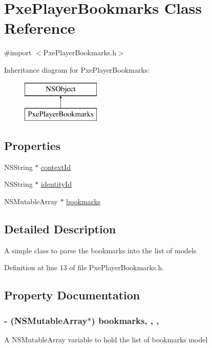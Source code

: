 \hypertarget{interface_pxe_player_bookmarks}{\section{Pxe\-Player\-Bookmarks Class Reference}
\label{interface_pxe_player_bookmarks}
}


{\ttfamily \#import $<$Pxe\-Player\-Bookmarks.\-h$>$}

Inheritance diagram for Pxe\-Player\-Bookmarks\-:\begin{figure}[H]
\begin{center}
\leavevmode
\includegraphics[height=2.000000cm]{interface_pxe_player_bookmarks}
\end{center}
\end{figure}
\subsection*{Properties}
\begin{DoxyCompactItemize}
\item 
N\-S\-String $\ast$ \hyperlink{interface_pxe_player_bookmarks_a7cae98aa1c704bcf06ebeb3849b58172}{context\-Id}
\item 
N\-S\-String $\ast$ \hyperlink{interface_pxe_player_bookmarks_a44a7ebbd3c3d8848820951f2256f6fff}{identity\-Id}
\item 
N\-S\-Mutable\-Array $\ast$ \hyperlink{interface_pxe_player_bookmarks_addada49f6619deb1557130ed6fdf0fc1}{bookmarks}
\end{DoxyCompactItemize}


\subsection{Detailed Description}
A simple class to parse the bookmarks into the list of models 

Definition at line 13 of file Pxe\-Player\-Bookmarks.\-h.



\subsection{Property Documentation}
\hypertarget{interface_pxe_player_bookmarks_addada49f6619deb1557130ed6fdf0fc1}{
\subsubsection[{bookmarks}]{\setlength{\rightskip}{0pt plus 5cm}-\/ (N\-S\-Mutable\-Array$\ast$) bookmarks\hspace{0.3cm}{\ttfamily [read]}, {\ttfamily [write]}, {\ttfamily [nonatomic]}, {\ttfamily [strong]}}}\label{interface_pxe_player_bookmarks_addada49f6619deb1557130ed6fdf0fc1}
A N\-S\-Mutable\-Array variable to hold the list of bookmarks model 

